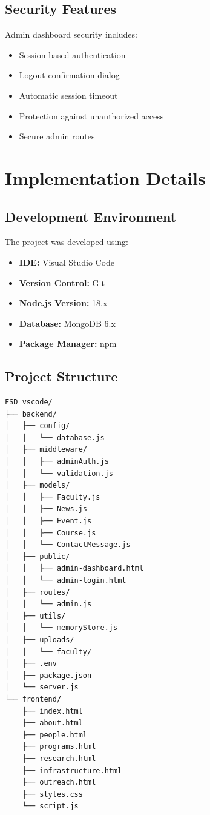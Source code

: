\documentclass[12pt,a4paper]{report}
\begin{document}
\section{Security Features}
Admin dashboard security includes:
\begin{itemize}
    \item Session-based authentication
    \item Logout confirmation dialog
    \item Automatic session timeout
    \item Protection against unauthorized access
    \item Secure admin routes
\end{itemize}

\chapter{Implementation Details}
\label{chap:implementation}

\section{Development Environment}
The project was developed using:
\begin{itemize}
    \item \textbf{IDE:} Visual Studio Code
    \item \textbf{Version Control:} Git
    \item \textbf{Node.js Version:} 18.x
    \item \textbf{Database:} MongoDB 6.x
    \item \textbf{Package Manager:} npm
\end{itemize}

\section{Project Structure}
\begin{lstlisting}[language=bash, caption=Project Structure]
FSD_vscode/
├── backend/
│   ├── config/
│   │   └── database.js
│   ├── middleware/
│   │   ├── adminAuth.js
│   │   └── validation.js
│   ├── models/
│   │   ├── Faculty.js
│   │   ├── News.js
│   │   ├── Event.js
│   │   ├── Course.js
│   │   └── ContactMessage.js
│   ├── public/
│   │   ├── admin-dashboard.html
│   │   └── admin-login.html
│   ├── routes/
│   │   └── admin.js
│   ├── utils/
│   │   └── memoryStore.js
│   ├── uploads/
│   │   └── faculty/
│   ├── .env
│   ├── package.json
│   └── server.js
└── frontend/
    ├── index.html
    ├── about.html
    ├── people.html
    ├── programs.html
    ├── research.html
    ├── infrastructure.html
    ├── outreach.html
    ├── styles.css
    └── script.js
\end{lstlisting}
\end{document}
